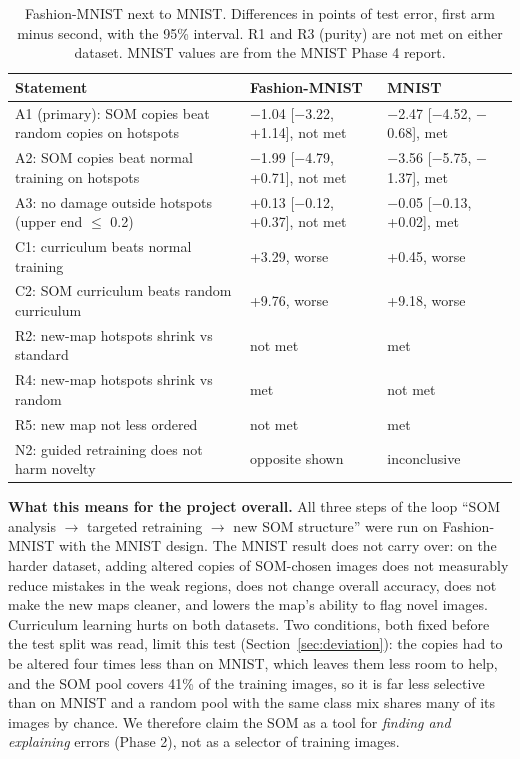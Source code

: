 \documentclass[11pt]{article}
\begin{document}
\begin{table}[H]
\centering
\renewcommand{\arraystretch}{1.12}
\footnotesize
{\setlength{\tabcolsep}{3pt}\begin{tabular}{|>{\raggedright\arraybackslash}p{}|C{0.27\textwidth}|C{0.27\textwidth}|}
\hline
\textbf{Statement} & \textbf{Fashion-MNIST} & \textbf{MNIST} \\ \hline
A1 (primary): SOM copies beat random copies on hotspots & $-$1.04 [$-$3.22, +1.14], not met & $-$2.47 [$-$4.52, $-$0.68], met \\ \hline
A2: SOM copies beat normal training on hotspots & $-$1.99 [$-$4.79, +0.71], not met & $-$3.56 [$-$5.75, $-$1.37], met \\ \hline
A3: no damage outside hotspots (upper end $\le$ 0.2) & +0.13 [$-$0.12, +0.37], not met & $-$0.05 [$-$0.13, +0.02], met \\ \hline
C1: curriculum beats normal training & +3.29, worse & +0.45, worse \\ \hline
C2: SOM curriculum beats random curriculum & +9.76, worse & +9.18, worse \\ \hline
R2: new-map hotspots shrink vs standard & not met & met \\ \hline
R4: new-map hotspots shrink vs random & met & not met \\ \hline
R5: new map not less ordered & not met & met \\ \hline
N2: guided retraining does not harm novelty & opposite shown & inconclusive \\ \hline
\end{tabular}}
\caption{Fashion-MNIST next to MNIST. Differences in points of test error, first arm minus second, with the 95\% interval. R1 and R3 (purity) are not met on either dataset. MNIST values are from the MNIST Phase 4 report.}
\label{tab:mnist}
\end{table}

\textbf{What this means for the project overall.} All three steps of the loop ``SOM analysis $\rightarrow$ targeted retraining $\rightarrow$ new SOM structure'' were run on Fashion-MNIST with the MNIST design. The MNIST result does not carry over: on the harder dataset, adding altered copies of SOM-chosen images does not measurably reduce mistakes in the weak regions, does not change overall accuracy, does not make the new maps cleaner, and lowers the map's ability to flag novel images. Curriculum learning hurts on both datasets. Two conditions, both fixed before the test split was read, limit this test (Section~\ref{sec:deviation}): the copies had to be altered four times less than on MNIST, which leaves them less room to help, and the SOM pool covers 41\% of the training images, so it is far less selective than on MNIST and a random pool with the same class mix shares many of its images by chance. We therefore claim the SOM as a tool for \emph{finding and explaining} errors (Phase 2), not as a selector of training images.
\end{document}
